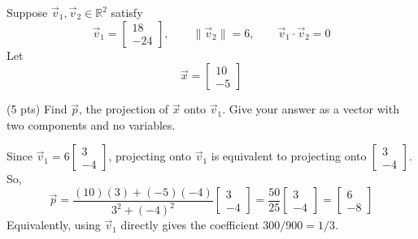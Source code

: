 \documentclass[11pt,twoside]{article}
\begin{document}
\begin{prob}[(12 pts)]
Suppose $\vec v_1,\vec v_2\in\mathbb R^2$ satisfy
\[
\vec v_1=\begin{bmatrix}18\\-24\end{bmatrix},\qquad
\lVert\vec v_2\rVert=6,\qquad
\vec v_1\cdot\vec v_2=0
\]
Let
\[
\vec x=\begin{bmatrix}10\\-5\end{bmatrix}
\]

\begin{subprob}(5 pts) Find $\vec p$, the projection of $\vec x$ onto $\vec v_1$. Give your answer as a vector with two components and no variables.
\par\medskip

\begin{solution}
Since $\vec v_1=6\begin{bmatrix}3\\-4\end{bmatrix}$, projecting onto $\vec v_1$ is equivalent to projecting onto $\begin{bmatrix}3\\-4\end{bmatrix}$. So,
\[
\vec p=\frac{(10)(3)+(-5)(-4)}{3^2+(-4)^2}\begin{bmatrix}3\\-4\end{bmatrix}
=\frac{50}{25}\begin{bmatrix}3\\-4\end{bmatrix}
=\boxed{\begin{bmatrix}6\\-8\end{bmatrix}}
\]
Equivalently, using $\vec v_1$ directly gives the coefficient $300/900=1/3$.

\begin{center}
\end{center}
\end{solution}
\end{subprob}


\end{prob}
\end{document}

